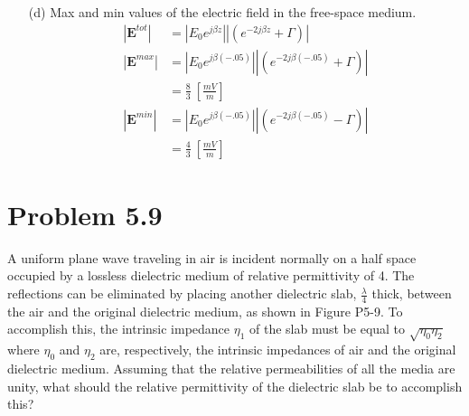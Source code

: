 \documentclass[12pt]{article}
\begin{document}
\begin{itemize}
\item[(d)] Max and min values of the electric field in the free-space medium.
\begin{align*}
  |\mathbf{E}^{tot}| &= |E_0 e^{j \beta z}||(e^{-2j \beta z} + \Gamma)|\\
  |\mathbf{E}^{max}| &=  |E_0 e^{j \beta (-.05)}||(e^{-2j \beta (-.05)} + \Gamma)|\\
                     &= \frac{8}{3}\ \left[\frac{mV}{m}\right]\\
  |\mathbf{E}^{min}| &=  |E_0 e^{j \beta (-.05)}||(e^{-2j \beta (-.05)} - \Gamma)|\\
                     &= \frac{4}{3}\ \left[\frac{mV}{m}\right]
\end{align*}  
\end{itemize}
\newpage
\section*{Problem 5.9}
A uniform plane wave traveling in air is incident normally on a half space occupied by a lossless dielectric medium of relative permittivity of 4. The reflections can be eliminated by placing another dielectric slab, $\frac{\lambda}{4}$ thick, between the air and the original dielectric medium, as shown in Figure P5-9. To accomplish this, the intrinsic impedance $\eta_1$ of the slab must be equal to $\sqrt{\eta_0\eta_2}$ where $\eta_0$ and $\eta_2$ are, respectively, the intrinsic impedances of air and the original dielectric medium. Assuming that the relative permeabilities of all the media are unity, what should the relative permittivity of the dielectric slab be to accomplish this?
\begin{center}
\end{center}
\end{document}
